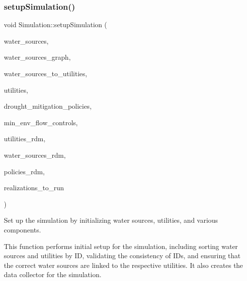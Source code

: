 \subsubsection{\texorpdfstring{setup\+Simulation()}{setupSimulation()}}
{\footnotesize\ttfamily void Simulation\+::setup\+Simulation (\begin{DoxyParamCaption}\item[{vector$<$ \mbox{\hyperlink{classWaterSource}{Water\+Source}} $\ast$$>$ \&}]{water\+\_\+sources,  }\item[{\mbox{\hyperlink{classGraph}{Graph}} \&}]{water\+\_\+sources\+\_\+graph,  }\item[{const vector$<$ vector$<$ int $>$$>$ \&}]{water\+\_\+sources\+\_\+to\+\_\+utilities,  }\item[{vector$<$ \mbox{\hyperlink{classUtility}{Utility}} $\ast$$>$ \&}]{utilities,  }\item[{const vector$<$ \mbox{\hyperlink{classDroughtMitigationPolicy}{Drought\+Mitigation\+Policy}} $\ast$$>$ \&}]{drought\+\_\+mitigation\+\_\+policies,  }\item[{vector$<$ \mbox{\hyperlink{classMinEnvFlowControl}{Min\+Env\+Flow\+Control}} $\ast$$>$ \&}]{min\+\_\+env\+\_\+flow\+\_\+controls,  }\item[{vector$<$ vector$<$ double $>$$>$ \&}]{utilities\+\_\+rdm,  }\item[{vector$<$ vector$<$ double $>$$>$ \&}]{water\+\_\+sources\+\_\+rdm,  }\item[{vector$<$ vector$<$ double $>$$>$ \&}]{policies\+\_\+rdm,  }\item[{vector$<$ unsigned long $>$ \&}]{realizations\+\_\+to\+\_\+run }\end{DoxyParamCaption})}



Set up the simulation by initializing water sources, utilities, and various components. 

This function performs initial setup for the simulation, including sorting water sources and utilities by ID, validating the consistency of I\+Ds, and ensuring that the correct water sources are linked to the respective utilities. It also creates the data collector for the simulation.


